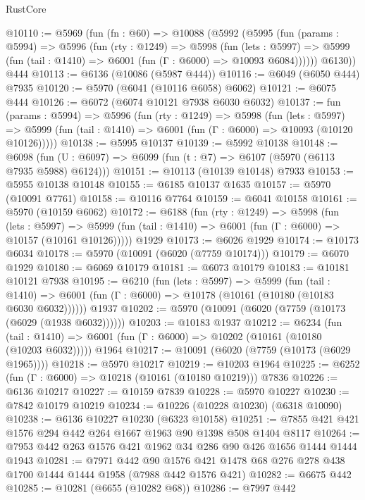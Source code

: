 \begin{lexlean}{RustCore}
\begin{coremodule}
{\begin{coremodule}
{{{{{{{{{{{{{{{{{{{{{{{{{{{{{{{{{{{{{{{{{{{{{@10110 := @5969
    (fun (fn : @60) =>
    @10088
      (@5992
        (@5995
          (fun (params : @5994) =>
          @5996
            (fun (rty : @1249) =>
            @5998
              (fun (lets : @5997) =>
              @5999 (fun (tail : @1410) => @6001 (fun (Γ : @6000) => @10093 @6084))))))
        @6130))
    @444
@10113 := @6136 (@10086 (@5987 @444))
@10116 := @6049 (@6050 @444) @7935
@10120 := @5970 (@6041 (@10116 @6058) @6062)
@10121 := @6075 @444
@10126 := @6072 (@6074 @10121 @7938 @6030 @6032)
@10137 := fun (params : @5994) =>
  @5996
    (fun (rty : @1249) =>
    @5998
      (fun (lets : @5997) =>
      @5999 (fun (tail : @1410) => @6001 (fun (Γ : @6000) => @10093 (@10120 @10126)))))
@10138 := @5995 @10137
@10139 := @5992 @10138
@10148 := @6098 (fun (U : @6097) => @6099 (fun (t : @7) => @6107 (@5970 (@6113 @7935 @5988) @6124)))
@10151 := @10113 (@10139 @10148) @7933
@10153 := @5955 @10138 @10148
@10155 := @6185 @10137 @1635
@10157 := @5970 (@10091 @7761)
@10158 := @10116 @7764
@10159 := @6041 @10158
@10161 := @5970 (@10159 @6062)
@10172 := @6188
    (fun (rty : @1249) =>
    @5998
      (fun (lets : @5997) =>
      @5999 (fun (tail : @1410) => @6001 (fun (Γ : @6000) => @10157 (@10161 @10126)))))
    @1929
@10173 := @6026 @1929
@10174 := @10173 @6034
@10178 := @5970 (@10091 (@6020 (@7759 @10174)))
@10179 := @6070 @1929
@10180 := @6069 @10179
@10181 := @6073 @10179
@10183 := @10181 @10121 @7938
@10195 := @6210
    (fun (lets : @5997) =>
    @5999
      (fun (tail : @1410) =>
      @6001 (fun (Γ : @6000) => @10178 (@10161 (@10180 (@10183 @6030 @6032))))))
    @1937
@10202 := @5970 (@10091 (@6020 (@7759 (@10173 (@6029 (@1938 @6032))))))
@10203 := @10183 @1937
@10212 := @6234
    (fun (tail : @1410) => @6001 (fun (Γ : @6000) => @10202 (@10161 (@10180 (@10203 @6032)))))
    @1964
@10217 := @10091 (@6020 (@7759 (@10173 (@6029 @1965))))
@10218 := @5970 @10217
@10219 := @10203 @1964
@10225 := @6252 (fun (Γ : @6000) => @10218 (@10161 (@10180 @10219))) @7836
@10226 := @6136 @10217
@10227 := @10159 @7839
@10228 := @5970 @10227
@10230 := @7842 @10179 @10219
@10234 := @10226 (@10228 @10230) (@6318 @10090)
@10238 := @6136 @10227 @10230 (@6323 @10158)
@10251 := @7855 @421 @421 @1576 @294 @442 @264 @1667 @1963 @90 @1398 @508 @1404 @8117
@10264 := @7953 @442 @263 @1576 @421 @1962 @34 @286 @90 @426 @1656 @1444 @1444 @1943
@10281 := @7971
    @442
    @90
    @1576
    @421
    @1478
    @68
    @276
    @278
    @438
    @1700
    @1444
    @1444
    @1958
    (@7988 @442 @1576 @421)
@10282 := @6675 @442
@10285 := @10281 (@6655 (@10282 @68))
@10286 := @7997 @442
}}}}}}}}}}}}}}}}}}}}}}}}}}}}}}}}}}}}}}}}}}}}}
\end{coremodule}}
\end{coremodule}
\end{lexlean}
